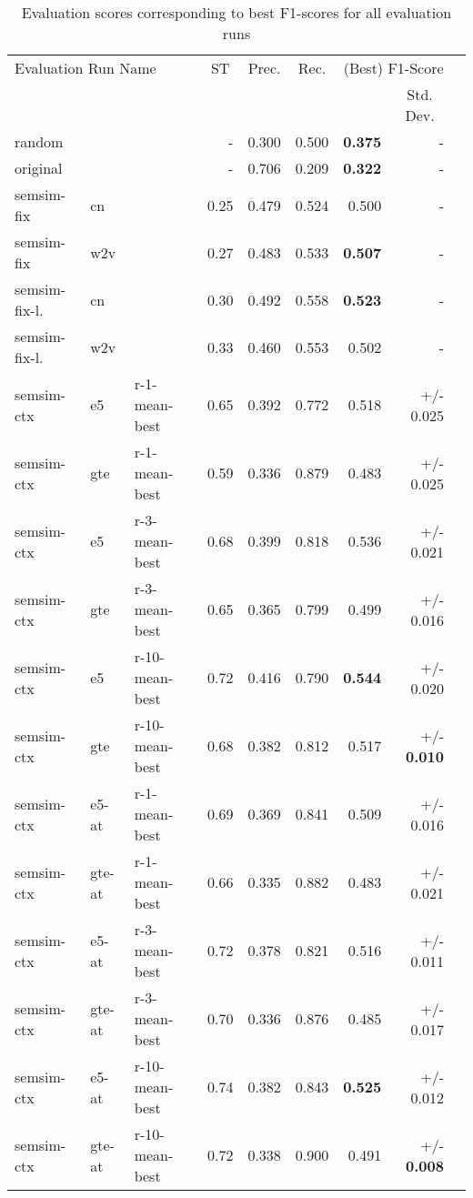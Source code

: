 \documentclass[11pt]{scrreprt}
\begin{document}
\begin{table}
\centering
\begin{tabular}{lllrrrrrr}
\toprule
\multicolumn{3}{l}{Evaluation Run Name}	& \multicolumn{1}{c}{ST} & \multicolumn{1}{c}{Prec.} & \multicolumn{1}{c}{Rec.} & \multicolumn{2}{c}{(Best) F1-Score}\\
\cmidrule{7-8}
\multicolumn{7}{l}{} & \multicolumn{1}{c}{Std. Dev.} \\
\midrule
random &  &  & - & 0.300 & 0.500 & \textbf{0.375} & - \\
\hline
original &  &  & - & 0.706 & 0.209 & \textbf{0.322} & - \\
\hline
semsim-fix & cn &  & 0.25 & 0.479 & 0.524 & 0.500 & - \\
semsim-fix & w2v &  & 0.27 & 0.483 & 0.533 & \textbf{0.507} & - \\
\hline
semsim-fix-l. & cn &  & 0.30 & 0.492 & 0.558 & \textbf{0.523} & - \\
semsim-fix-l. & w2v &  & 0.33 & 0.460 & 0.553 & 0.502 & - \\
\hline
semsim-ctx & e5 & r-1-mean-best & 0.65 & 0.392 & 0.772 & 0.518 & +/- 0.025 \\
semsim-ctx & gte & r-1-mean-best & 0.59 & 0.336 & 0.879 & 0.483 & +/- 0.025 \\
semsim-ctx & e5 & r-3-mean-best & 0.68 & 0.399 & 0.818 & 0.536 & +/- 0.021 \\
semsim-ctx & gte & r-3-mean-best & 0.65 & 0.365 & 0.799 & 0.499 & +/- 0.016 \\
semsim-ctx & e5 & r-10-mean-best & 0.72 & 0.416 & 0.790 & \textbf{0.544} & +/- 0.020 \\
semsim-ctx & gte & r-10-mean-best & 0.68 & 0.382 & 0.812 & 0.517 & +/- \textbf{0.010} \\

\hline
semsim-ctx & e5-at & r-1-mean-best & 0.69 & 0.369 & 0.841 & 0.509 & +/- 0.016 \\
semsim-ctx & gte-at & r-1-mean-best & 0.66 & 0.335 & 0.882 & 0.483 & +/- 0.021 \\
semsim-ctx & e5-at & r-3-mean-best & 0.72 & 0.378 & 0.821 & 0.516 & +/- 0.011 \\
semsim-ctx & gte-at & r-3-mean-best & 0.70 & 0.336 & 0.876 & 0.485 & +/- 0.017 \\
semsim-ctx & e5-at & r-10-mean-best & 0.74 & 0.382 & 0.843 & \textbf{0.525} & +/- 0.012 \\
semsim-ctx & gte-at & r-10-mean-best & 0.72 & 0.338 & 0.900 & 0.491 & +/- \textbf{0.008} \\
\bottomrule
\end{tabular}
\caption{Evaluation scores corresponding to best F1-scores for all evaluation runs}
\label{tab:quant-results}
\end{table}
\end{document}
